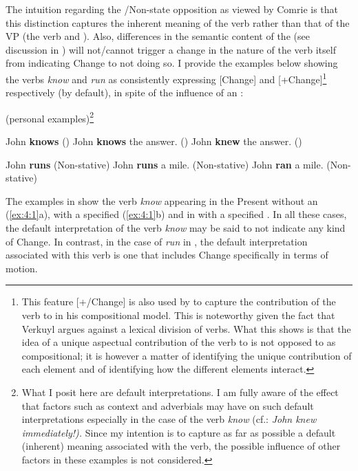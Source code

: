 The intuition regarding the \slash Non-state opposition as viewed by
Comrie is that this distinction captures the inherent meaning of the
verb rather than that of the VP (the verb and ).
Also, differences in the semantic content of the 
(see discussion in ) will not\slash cannot trigger a change in
the nature of the verb itself from indicating Change to not doing so.
I provide the examples below showing the verbs \textit{know} and \textit{run} as
consistently expressing [\textminus Change] and [+Change]\footnote{This feature
  [+/\textminus Change] is also used by \citet{Verkuyl1999} to capture the
  contribution of the verb to  in his compositional model. This
  is noteworthy given the fact that Verkuyl argues against a lexical
  division of verbs.  What this shows is that the idea of a unique
  aspectual contribution of the verb to  is not opposed to
   as compositional; it is however a matter of identifying the
  unique contribution of each element and of identifying how the
  different elements interact.} respectively (by default), in spite of
the influence of an :\largerpage

\ea\label{ex:4:1} (personal examples)\footnote{What I posit here are
  default interpretations. I am fully aware of the effect that factors
  such as context and adverbials may have on such default
  interpretations especially in the case of the verb \textit{know} (cf.:
  \textit{John knew immediately!).} Since my intention is to capture
  as far as possible a default (inherent) meaning associated with the
  verb, the possible influence of other factors in these examples is
  not considered.}

\ea John \textbf{knows} () \ex John \textbf{knows} the answer.
() \ex John \textbf{knew} the answer. () \z \z

\ea%
\label{ex:4:2}
\ea John \textbf{runs} (Non-stative) \ex John \textbf{runs} a mile.
(Non-stative) \ex John \textbf{ran} a mile. (Non-stative) \z \z

The examples in  show the verb \textit{know} appearing in the
Present  without an  (\ref{ex:4:1}a), with a
specified  (\ref{ex:4:1}b) and in   with a
specified .  In all these cases, the default
interpretation of the verb \textit{know} may be said to not indicate any kind
of Change.  In contrast, in the case of \textit{run} in , the
default interpretation associated with this verb is one that includes
Change specifically in terms of motion.

